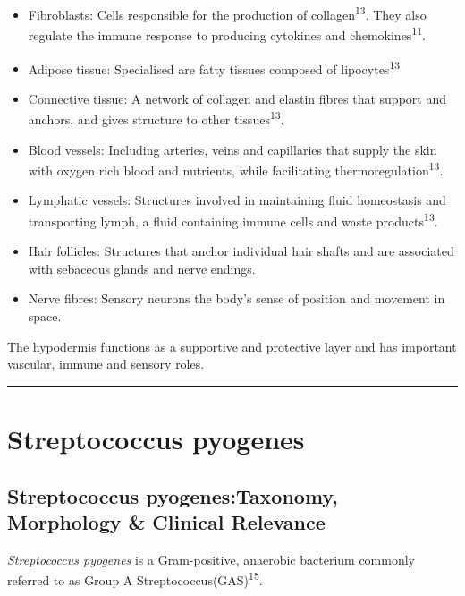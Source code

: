 \documentclass[
]{article}
\begin{document}
\begin{itemize}
\item
  Fibroblasts: Cells responsible for the production of
  collagen\textsuperscript{13}. They also regulate the immune response
  to producing cytokines and chemokines\textsuperscript{11}.
\item
  Adipose tissue: Specialised are fatty tissues composed of
  lipocytes\textsuperscript{13}
\item
  Connective tissue: A network of collagen and elastin fibres that
  support and anchors, and gives structure to other
  tissues\textsuperscript{13}.
\item
  Blood vessels: Including arteries, veins and capillaries that supply
  the skin with oxygen rich blood and nutrients, while facilitating
  thermoregulation\textsuperscript{13}.
\item
  Lymphatic vessels: Structures involved in maintaining fluid
  homeostasis and transporting lymph, a fluid containing immune cells
  and waste products\textsuperscript{13}.
\item
  Hair follicles: Structures that anchor individual hair shafts and are
  associated with sebaceous glands and nerve endings.
\item
  Nerve fibres: Sensory neurons the body's sense of position and
  movement in space.
\end{itemize}

The hypodermis functions as a supportive and protective layer and has
important vascular, immune and sensory roles.

\begin{center}\rule{0.5\linewidth}{0.5pt}\end{center}

\newpage

\section{Streptococcus pyogenes}\label{streptococcus-pyogenes}

\subsection{Streptococcus pyogenes:Taxonomy, Morphology \& Clinical
Relevance}\label{streptococcus-pyogenestaxonomy-morphology-clinical-relevance}

\emph{Streptococcus pyogenes} is a Gram-positive, anaerobic bacterium
commonly referred to as Group A Streptococcus(GAS)\textsuperscript{15}.
\end{document}

